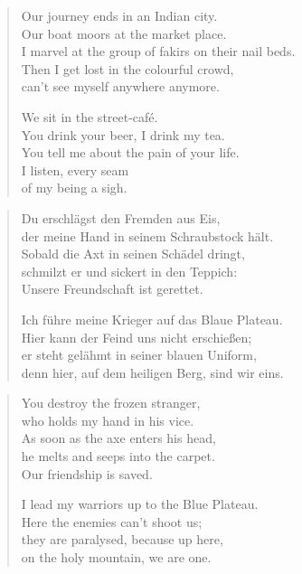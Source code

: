 {\begin{verse}
\rhytmbreak

Our journey ends in an Indian city.\\
Our boat moors at the market place.\\
I marvel at the group of fakirs on their nail beds.\\
Then I get lost in the colourful crowd,\\
can't see myself anywhere anymore.

\rhytmbreak

We sit in the street-café.\\
You drink your beer, I drink my tea.\\
You tell me about the pain of your life.\\
I listen, every seam\\
of my being a sigh.

\rhytmbreak
\end{verse}

\clearpage

\begin{verse}
Du erschlägst den Fremden aus Eis,\\
der meine Hand in seinem Schraubstock hält.\\
Sobald die Axt in seinen Schädel dringt,\\
schmilzt er und sickert in den Teppich:\\
Unsere Freundschaft ist gerettet.

\rhytmbreak

Ich führe meine Krieger auf das Blaue Plateau.\\
Hier kann der Feind uns nicht erschießen;\\
er steht gelähmt in seiner blauen Uniform,\\
denn hier, auf dem heiligen Berg, sind wir eins.
\end{verse}

\clearpage

\begin{verse}

You destroy the frozen stranger,\\
who holds my hand in his vice.\\
As soon as the axe enters his head,\\
he melts and seeps into the carpet.\\
Our friendship is saved.

\rhytmbreak

I lead my warriors up to the Blue Plateau.\\
Here the enemies can't shoot us;\\
they are paralysed, because up here,\\
on the holy mountain, we are one.
\end{verse}

}
